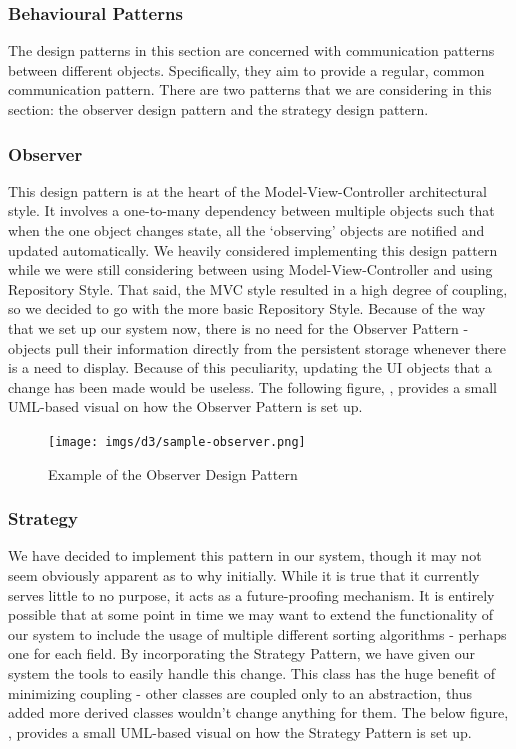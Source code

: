 \documentclass[12pt,letterpaper]{article}
\begin{document}
\subsubsection{Behavioural Patterns}
The design patterns in this section are concerned with communication patterns between different objects. Specifically, they aim to provide a regular, common communication pattern. There are two patterns that we are considering in this section: the observer design pattern and the strategy design pattern.

\subsubsection*{Observer}

This design pattern is at the heart of the Model-View-Controller architectural style. It involves a one-to-many dependency between multiple objects such that when the one object changes state, all the `observing' objects are notified and updated automatically. We heavily considered implementing this design pattern while we were still considering between using Model-View-Controller and using Repository Style. That said, the MVC style resulted in a high degree of coupling, so we decided to go with the more basic Repository Style. Because of the way that we set up our system now, there is no need for the Observer Pattern - objects pull their information directly from the persistent storage whenever there is a need to display. Because of this peculiarity, updating the UI objects that a change has been made would be useless. The following figure, , provides a small UML-based visual on how the Observer Pattern is set up.

\begin{figure}[H]
	\centering{}
	\texttt{[image: imgs/d3/sample-observer.png]}
	\caption{Example of the Observer Design Pattern}
\end{figure}

\subsubsection*{Strategy}

We have decided to implement this pattern in our system, though it may not seem obviously apparent as to why initially. While it is true that it currently serves little to no purpose, it acts as a future-proofing mechanism. It is entirely possible that at some point in time we may want to extend the functionality of our system to include the usage of multiple different sorting algorithms - perhaps one for each field. By incorporating the Strategy Pattern, we have given our system the tools to easily handle this change. This class has the huge benefit of minimizing coupling - other classes are coupled only to an abstraction, thus added more derived classes wouldn't change anything for them. The below figure, , provides a small UML-based visual on how the Strategy Pattern is set up.
\end{document}
